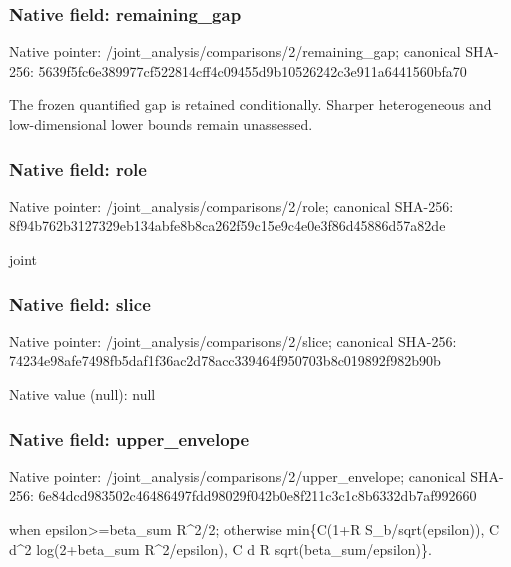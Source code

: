 \documentclass[10pt,a4paper]{article}
\begin{document}
\subsubsection{Native field: remaining\_\allowbreak{}gap}
Native pointer: /joint\_\allowbreak{}analysis/comparisons/2/remaining\_\allowbreak{}gap; canonical SHA-256: 5639f5fc6e389977cf522814cff4c09455d9b10526242c3e911a6441560bfa70

\begingroup\raggedright\sloppy The frozen quantified gap is retained conditionally. Sharper heterogeneous and low-dimensional lower bounds remain unassessed.\par\endgroup

\subsubsection{Native field: role}
Native pointer: /joint\_\allowbreak{}analysis/comparisons/2/role; canonical SHA-256: 8f94b762b3127329eb134abfe8b8ca262f59c15e9c4e0e3f86d45886d57a82de

\begingroup\raggedright\sloppy joint\par\endgroup

\subsubsection{Native field: slice}
Native pointer: /joint\_\allowbreak{}analysis/comparisons/2/slice; canonical SHA-256: 74234e98afe7498fb5daf1f36ac2d78acc339464f950703b8c019892f982b90b

Native value (null): null

\subsubsection{Native field: upper\_\allowbreak{}envelope}
Native pointer: /joint\_\allowbreak{}analysis/comparisons/2/upper\_\allowbreak{}envelope; canonical SHA-256: 6e84dcd983502c46486497fdd98029f042b0e8f211c3c1c8b6332db7af992660

\begingroup\raggedright{} when epsilon>=\allowbreak{}beta\_\allowbreak{}sum R\textasciicircum{}2/\allowbreak{}2;\allowbreak{} otherwise min\{C(1+R S\_\allowbreak{}b/\allowbreak{}sqrt(epsilon)),\allowbreak{} C d\textasciicircum{}2 log(2+beta\_\allowbreak{}sum R\textasciicircum{}2/\allowbreak{}epsilon),\allowbreak{} C d R sqrt(beta\_\allowbreak{}sum/\allowbreak{}epsilon)\}.\par\endgroup
\end{document}

